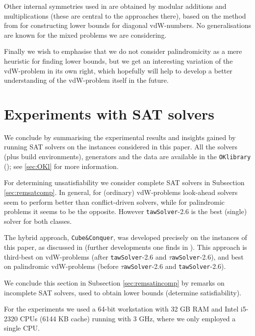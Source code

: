 \documentclass[final,3p,times]{elsarticle}
\theoremstyle{definition}
\newcommand{\OKlibrary}{\texttt{OKlibrary}}
\newcommand{\tawsolver}{\texttt{tawSolver}}
\newcommand{\ntawsolver}{\tawsolver-2.6}
\newcommand{\ttawsolver}{$\tau$\texttt{awSolver}-2.6}
\newcommand{\cubeconq}{\texttt{Cube\:\&\:Conquer}}
\begin{document}
Other internal symmetries used in \cite{herwig,HeuleWalsh2010SolutionsSymmetry,HeuleWalsh2010SolutionsSymmetryW} are obtained by modular additions and multiplications (these are central to the approaches there), based on the method from \cite{Rabung1979vdW} for constructing lower bounds for diagonal vdW-numbers. No generalisations are known for the mixed problems we are considering.

Finally we wish to emphasise that we do not consider palindromicity as a mere heuristic for finding lower bounds, but we get an interesting variation of the vdW-problem in its own right, which hopefully will help to develop a better understanding of the vdW-problem itself in the future.



\section{Experiments with SAT solvers}
\label{sec:remsat}

We conclude by summarising the experimental results and insights gained by running SAT solvers on the instances considered in this paper. All the solvers (plus build environments), generators and the data are available in the \OKlibrary{} (\cite{Kullmann2009OKlibrary}); see \ref{sec:OKl}
for more information.

For determining unsatisfiability we consider complete SAT solvers in Subsection \ref{sec:remsatcomp}.
In general, for (ordinary) vdW-problems look-ahead solvers seem to perform better than conflict-driven solvers, while for palindromic problems it seems to be the opposite. However \ntawsolver{} is the best (single) solver for both classes.

The hybrid approach, \cubeconq, was developed precisely on the instances of this paper, as discussed in \cite{HeuleKullmannWieringaBiere2011Cubism} (further developments one finds in \cite{TakHeuleBiere2012CC}). This approach is third-best on vdW-problems (after \ntawsolver{} and \ttawsolver), and best on palindromic vdW-problems (before \ttawsolver{} and \ntawsolver).

We conclude this section in Subsection \ref{sec:remsatincomp} by remarks on incomplete SAT solvers, used to obtain lower bounds (determine satisfiability).

For the experiments we used a 64-bit workstation with 32 GB RAM and Intel i5-2320 CPUs (6144 KB cache) running with 3 GHz, where we only employed a single CPU.
\end{document}
